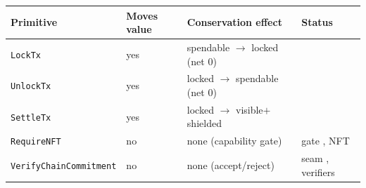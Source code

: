 \begin{center}
\begin{tabular}{@{}llll@{}}
\toprule
Primitive & Moves value & Conservation effect & Status \\
\midrule
\texttt{LockTx}                & yes & spendable $\to$ locked (net 0) & \DESIGN{} \\
\texttt{UnlockTx}              & yes & locked $\to$ spendable (net 0) & \DESIGN{} \\
\texttt{SettleTx}             & yes & locked $\to$ visible$+$shielded & \DESIGN{} \\
\texttt{RequireNFT}          & no  & none (capability gate)         & gate \DESIGN{}, NFT \IMPL{} \\
\texttt{VerifyChainCommitment} & no  & none (accept/reject)           & seam \DESIGN{}, verifiers \IMPL{} \\
\bottomrule
\end{tabular}
\end{center}
